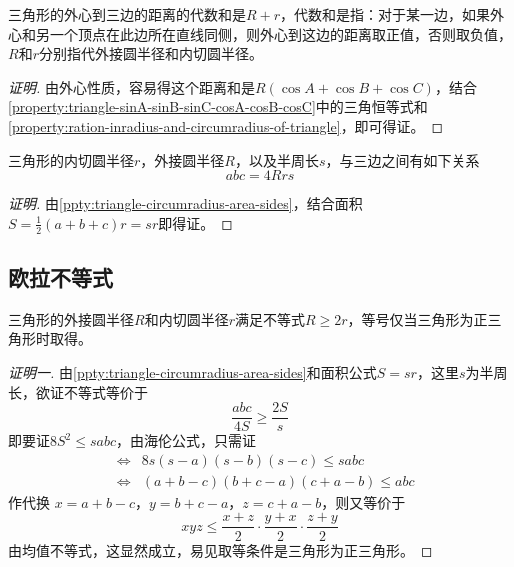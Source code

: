 \begin{inference}
  三角形的外心到三边的距离的代数和是$R+r$，代数和是指：对于某一边，如果外心和另一个顶点在此边所在直线同侧，则外心到这边的距离取正值，否则取负值，$R$和$r$分别指代外接圆半径和内切圆半径。
\end{inference}

\begin{proof}[证明]
  由外心性质，容易得这个距离和是$R(\cos{A}+\cos{B}+\cos{C})$，结合\autoref{property:triangle-sinA-sinB-sinC-cosA-cosB-cosC}中的三角恒等式和\autoref{property:ration-inradius-and-circumradius-of-triangle}，即可得证。
\end{proof}

\begin{property}
  三角形的内切圆半径$r$，外接圆半径$R$，以及半周长$s$，与三边之间有如下关系
  \begin{equation}
    \label{eq:triangle-abc-equal-4Rrs}
    abc = 4Rrs
  \end{equation}
\end{property}

\begin{proof}[证明]
  由\autoref{ppty:triangle-circumradius-area-sides}，结合面积$S=\frac{1}{2}(a+b+c)r=sr$即得证。
\end{proof}

\subsection{欧拉不等式}
\label{sec:euler-inequality}

\begin{theorem}
  三角形的外接圆半径$R$和内切圆半径$r$满足不等式$R \geqslant 2r$，等号仅当三角形为正三角形时取得。
\end{theorem}

\begin{proof}[证明一]
  由\autoref{ppty:triangle-circumradius-area-sides}和面积公式$S=sr$，这里$s$为半周长，欲证不等式等价于
  \begin{equation*}
    \frac{abc}{4S} \geqslant \frac{2S}{s}
  \end{equation*}
  即要证$8S^2 \leqslant sabc$，由海伦公式，只需证
  \begin{eqnarray*}
    & \Longleftrightarrow & 8s(s-a)(s-b)(s-c) \leqslant sabc \\
    & \Longleftrightarrow & (a+b-c)(b+c-a)(c+a-b) \leqslant abc
  \end{eqnarray*}
  作代换 $x=a+b-c$，$y=b+c-a$，$z=c+a-b$，则又等价于
  \begin{equation*}
    xyz \leqslant \frac{x+z}{2} \cdot \frac{y+x}{2} \cdot \frac{z+y}{2}
  \end{equation*}
  由均值不等式，这显然成立，易见取等条件是三角形为正三角形。
\end{proof}

